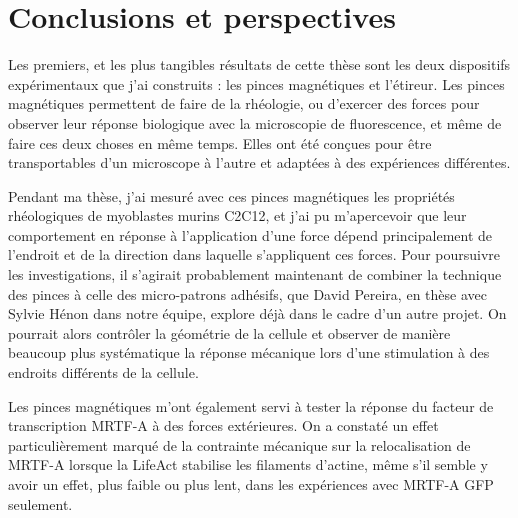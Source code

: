%
%
%
%

\chapter*{Conclusions et perspectives}

 Les premiers, et les plus tangibles résultats de cette thèse sont les deux dispositifs expérimentaux que j'ai construits : les pinces magnétiques et l'étireur. Les pinces magnétiques permettent de faire de la rhéologie, ou d'exercer des forces pour observer leur réponse biologique avec la microscopie de fluorescence, et même de faire ces deux choses en même temps. Elles ont été conçues pour être transportables d'un microscope à l'autre et adaptées à des expériences différentes. 
  
 Pendant ma thèse, j'ai mesuré avec ces pinces magnétiques les propriétés rhéologiques de myoblastes murins C2C12, et j'ai pu m'apercevoir que leur comportement en réponse à l'application d'une force dépend principalement de l'endroit et de la direction dans laquelle s'appliquent ces forces. Pour poursuivre les investigations, il s'agirait probablement maintenant de combiner la technique des pinces à celle des micro-patrons adhésifs, que David Pereira, en thèse avec Sylvie Hénon dans notre équipe, explore déjà dans le cadre d'un autre projet. On pourrait alors contrôler la géométrie de la cellule et observer de manière beaucoup plus systématique la réponse mécanique lors d'une stimulation à des endroits différents de la cellule. 

Les pinces magnétiques m'ont également servi à tester la réponse du facteur de transcription MRTF-A à des forces extérieures. On a constaté un effet particulièrement marqué de la contrainte mécanique sur la relocalisation de MRTF-A lorsque la LifeAct stabilise les filaments d'actine, même s'il semble y avoir un effet, plus faible ou plus lent, dans les expériences avec MRTF-A GFP seulement. 


